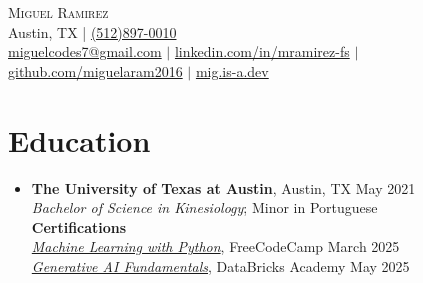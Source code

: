 \documentclass[letterpaper,10pt]{article}
\begin{document}
\begin{center}
  {\Large \scshape Miguel Ramirez} \\ \vspace{0pt}
  Austin, TX | \href{tel:+15128970010}{(512)897-0010} \\ 
  \href{mailto:miguelcodes7@gmail.com}{miguelcodes7@gmail.com} $|$
  \href{https://linkedin.com/in/mramirez-fs}{linkedin.com/in/mramirez-fs} $|$
  \href{https://github.com/miguelaram2016}{github.com/miguelaram2016} $|$
  \href{https://mig.is-a.dev}{mig.is-a.dev}
\end{center}

\section*{Education}
\begin{itemize}
  \item[]
    \textbf{The University of Texas at Austin}, Austin, TX \hfill May 2021 \\
    \textit{Bachelor of Science in Kinesiology}; Minor in Portuguese \vspace{3pt} \\ 
    \textbf{Certifications} \\
    \textit{\href{https://www.freecodecamp.org/certification/migglenero/machine-learning-with-python-v7}{Machine Learning with Python}}, FreeCodeCamp \hfill March 2025 \\
    \textit{\href{https://credentials.databricks.com/052cc354-c947-42d8-81bb-40c38d77ace3\#acc.B2op0GxP}{Generative AI Fundamentals}}, DataBricks Academy \hfill May 2025 
\end{itemize}

\end{document}
